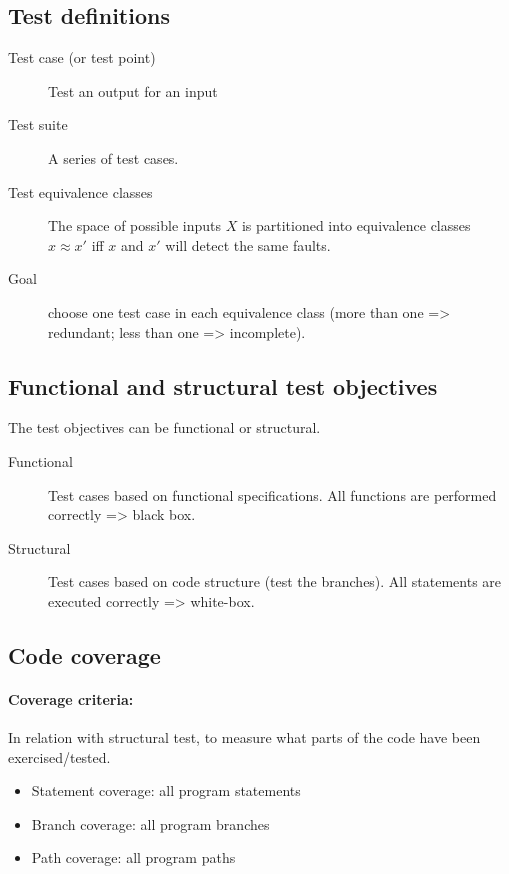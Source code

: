 \subsection{Test definitions}

\begin{description}
    \item[Test case (or test point)] Test an output for an input
    \item[Test suite] A series of test cases.
    \item[Test equivalence classes] The space of possible inputs $X$ is partitioned into equivalence classes $x \approx x'$ iff $x$ and $x'$ will detect the same faults.
    \item[Goal] choose one test case in each equivalence class (more than one => redundant; less than one => incomplete).
\end{description}

\subsection{Functional and structural test objectives}
The test objectives can be functional or structural. \newline

\begin{description}
    \item[Functional] Test cases based on functional specifications.
        \subitem{} All functions are performed correctly => black box.
    \item[Structural] Test cases based on code structure (test the branches).
        \subitem{} All statements are executed correctly => white-box.
\end{description}

\subsection{Code coverage}

\paragraph{Coverage criteria:}
In relation with structural test, to measure what parts of the code have been
exercised/tested.

\begin{itemize}
    \item Statement coverage: all program statements
    \item Branch coverage: all program branches
    \item Path coverage: all program paths
\end{itemize}

